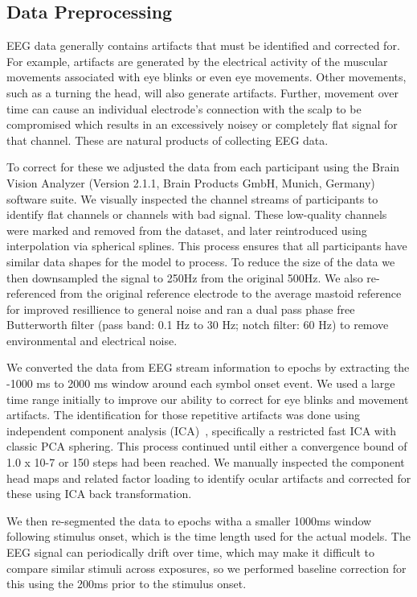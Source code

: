\subsection{Data Preprocessing}
\label{sec:preprocessing}
EEG data generally contains artifacts that must be identified and corrected 
for. For example, artifacts are generated by the electrical activity of the 
muscular movements associated with eye blinks or even eye movements. Other 
movements, such as a turning the head, will also generate artifacts. Further, 
movement over time can cause an individual electrode's connection with the 
scalp to be compromised which results in an excessively noisey or completely 
flat signal for that channel. These are natural products of collecting EEG 
data. 

To correct for these we adjusted the data from each participant using the Brain 
Vision Analyzer (Version 2.1.1, Brain Products GmbH, Munich, Germany) software 
suite. We visually inspected the channel streams of participants to identify 
flat channels or channels with bad signal. These low-quality channels were 
marked and removed from the dataset, and later reintroduced using interpolation 
via spherical splines. This process ensures that all participants have similar 
data shapes for the model to process. To reduce the size of the data we then 
downsampled the signal to 250Hz from the original 500Hz. We also re-referenced 
from the original reference electrode to the average mastoid reference for 
improved resillience to general noise and ran a dual pass phase free 
Butterworth filter (pass band: 0.1 Hz to 30 Hz; notch filter: 60 Hz) to remove 
environmental and electrical noise.

We converted the data from EEG stream information to epochs by extracting the 
-1000 ms to 2000 ms window around each symbol onset event. We used a large time 
range initially to improve our ability to correct for eye blinks and movement 
artifacts. The identification for those repetitive artifacts was done using 
independent component analysis (ICA)~\cite{luck2014introduction}, specifically 
a restricted fast ICA with classic PCA sphering. This process continued until 
either a convergence bound of 1.0 x 10-7 or 150 steps had been reached. We 
manually inspected the component head maps and related factor loading to 
identify ocular artifacts and corrected for these using ICA back 
transformation. 

We then re-segmented the data to epochs witha a smaller 1000ms window following 
stimulus onset, which is the time length used for the actual models. The EEG 
signal can periodically drift over time, which may make it difficult to compare 
similar stimuli across exposures, so we performed baseline correction for this 
using the 200ms prior to the stimulus onset. 


